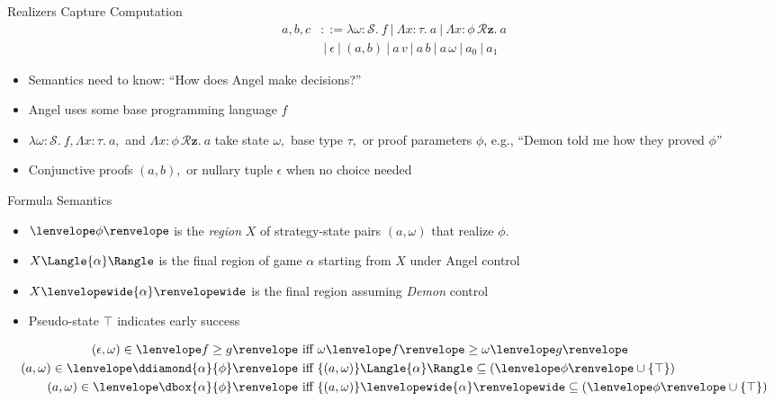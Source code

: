 \documentclass[slidestop,aspectratio=169]{beamer}
\newcommand{\allstate}{\mathcal{S}}
\newcommand{\tint}[2]{#2\lenvelope#1\renvelope}
\newcommand{\fint}[2]{#2\lenvelope#1\renvelope}
\newcommand{\om}{\omega}
\newcommand{\bebecomes}{\mathrel{::=}}
\newcommand{\alternative}{~|~}
\newcommand{\stt}{\top}
\newcommand{\rzFst}[1]{#1_0}
\newcommand{\rzSnd}[1]{#1_1}
\newcommand{\rzApp}[2]{#1\,#2}
\renewcommand{\aa}{a}
\newcommand{\ab}{b}
\newcommand{\ac}{c}
\newcommand{\allRz}{\mathcal{R}\mathbf{z}}
\newcommand{\rzfor}[1]{#1\,\allRz}
\newcommand{\rzNil}{\epsilon}
\newcommand{\rzCons}[2]{(#1,#2)}
\newcommand{\rzBLam}[2]{\lambda #1:\allstate.~#2}
\newcommand{\rzHOLam}[3]{\Lambda #1:\rzfor{#2}.~#3}
\newcommand{\rzFOLam}[3]{\Lambda #1:#2.~#3}
\newcommand{\fintR}[1]{\fint{#1}{}} %
\newcommand*{\strategyforR}[2][]{{#2}\Langle{#1}\Rangle}
\newcommand*{\dstrategyforR}[2][]{{#2}\lenvelopewide{#1}\renvelopewide}
\theoremstyle{plain}
\theoremstyle{definition}
\theoremstyle{remark}
\begin{document}
\begin{frame}[t]{Realizers Capture Computation}
  \begin{align*}
\aa,\ab,\ac
&\bebecomes \rzBLam{\om}{f} \alternative \rzFOLam{x}{\tau}{\aa} \alternative \rzHOLam{x}{\phi}{\aa} \\
&\alternative  \rzNil \alternative \rzCons{\aa}{\ab}\alternative \rzApp{\aa}{v} \alternative \rzApp{\aa}{\ab} \alternative \rzApp{\aa}{\om} \alternative \rzFst{\aa} \alternative \rzSnd{\aa}
  \end{align*}
\begin{itemize}
  \item Semantics need to know: ``How does Angel make decisions?''
  \item Angel uses some base programming language $f$
  \item $\rzBLam{\om}{f}, \rzFOLam{x}{\tau}{\aa},$ and $\rzHOLam{x}{\phi}{\aa}$ take state $\om,$ base type $\tau,$ or proof parameters $\phi$, e.g., ``Demon told me how they proved $\phi$''
  \item Conjunctive proofs $\rzCons{\aa}{\ab},$ or nullary tuple $\rzNil$ when no choice needed
\end{itemize}
\end{frame}

\begin{frame}[t]{Formula Semantics}
\begin{itemize}
\item $\fintR{\phi}$ is the \emph{region} $X$ of strategy-state pairs $(\aa,\om)$ that realize $\phi$.
\item $\strategyforR[\alpha]{X}$ is the final region of game $\alpha$ starting from $X$ under Angel control
\item $\dstrategyforR[\alpha]{X}$ is the final region assuming \emph{Demon} control
\item Pseudo-state $\top$ indicates early success
\end{itemize}
\begin{align*}
(\rzNil,\om) \in  \fintR{f \geq g}                 &\text{ iff } \tint{f}{\om} \geq \tint{g}{\om}\\
(\aa,\om) \in  \fintR{\ddiamond{\alpha}{\phi}}       &\text{ iff } \strategyforR[\alpha]{\{(\aa,\om)\}} \subseteq (\fintR{\phi} \cup \{\stt\})\\
(\aa,\om) \in  \fintR{\dbox{\alpha}{\phi}}              &\text{ iff } \dstrategyforR[\alpha]{\{(\aa,\om)\}} \subseteq (\fintR{\phi} \cup \{\stt\})
\end{align*}
\end{frame}
\end{document}
